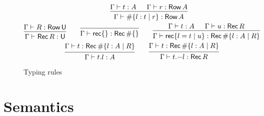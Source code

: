 \begin{figure}
\begin{gather*}
    \qquad
    \begin{prooftree}
      \hypo{\Gamma \vdash t : A}
      \hypo{\Gamma \vdash r : \RowType A}
      \infer2{\Gamma \vdash \# \{ l : t \mid r \} : \RowType A}
    \end{prooftree}
    \\
    \begin{prooftree}
      \hypo{\Gamma \vdash R : \RowType \Univ}
      \infer1{\Gamma \vdash \RecordType R : \Univ}
    \end{prooftree}
    \qquad
    \begin{prooftree}
      \infer0{\Gamma \vdash \RecordLit \{ \} : \RecordType \# \{ \}}
    \end{prooftree}
    \qquad
    \begin{prooftree}
      \hypo{\Gamma \vdash t : A}
      \hypo{\Gamma \vdash u : \RecordType R}
      \infer2{\Gamma \vdash \RecordLit \{ l = t \mid u \}
        : \RecordType \# \{ l : A \mid R \}}
    \end{prooftree}
    \\
    \begin{prooftree}
      \hypo{\Gamma \vdash t : \RecordType \# \{ l : A \mid R \}}
      \infer1{\Gamma \vdash t.l : A}
    \end{prooftree}
    \qquad
    \begin{prooftree}
      \hypo{\Gamma \vdash t : \RecordType \# \{ l : A \mid R \}}
      \infer1{\Gamma \vdash t \RecordRestr l : \RecordType R}
    \end{prooftree}
  \end{gather*}
  \caption{Typing rules}\label{fig:typing}
\end{figure}

\section{Semantics}

